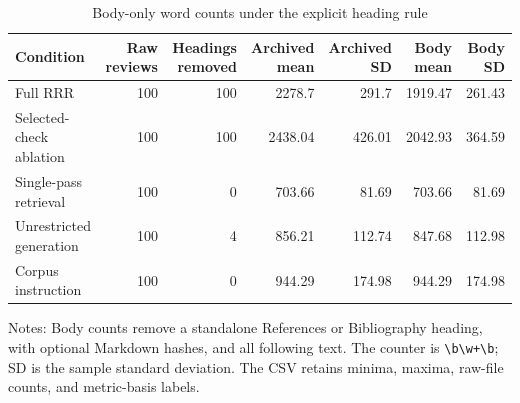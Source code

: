 \begin{table}[ht]
\centering
\caption{Body-only word counts under the explicit heading rule}
\begin{threeparttable}
\small
\begin{tabular}{lrrrrrr}
\toprule
Condition & Raw reviews & Headings removed & Archived mean & Archived SD & Body mean & Body SD \\
\midrule
Full RRR & 100 & 100 & 2278.7 & 291.7 & 1919.47 & 261.43 \\
Selected-check ablation & 100 & 100 & 2438.04 & 426.01 & 2042.93 & 364.59 \\
Single-pass retrieval & 100 & 0 & 703.66 & 81.69 & 703.66 & 81.69 \\
Unrestricted generation & 100 & 4 & 856.21 & 112.74 & 847.68 & 112.98 \\
Corpus instruction & 100 & 0 & 944.29 & 174.98 & 944.29 & 174.98 \\
\bottomrule
\end{tabular}
\begin{tablenotes}[flushleft]\scriptsize
\item Notes: Body counts remove a standalone References or Bibliography heading, with optional Markdown hashes, and all following text. The counter is \texttt{\textbackslash b\textbackslash w+\textbackslash b}; SD is the sample standard deviation. The CSV retains minima, maxima, raw-file counts, and metric-basis labels.
\end{tablenotes}
\end{threeparttable}
\end{table}
